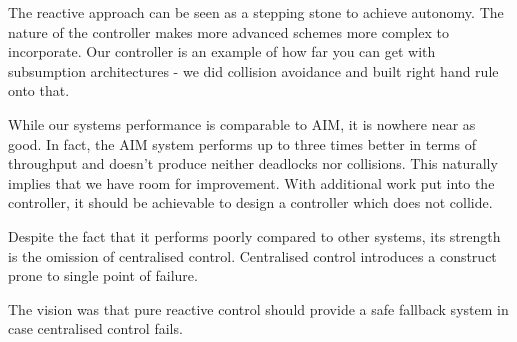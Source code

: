 The reactive approach can be seen as a stepping stone to achieve autonomy.
The nature of the controller makes more advanced schemes more complex to incorporate.
Our controller is an example of how far you can get with subsumption architectures - we did collision avoidance and built right hand rule onto that.

While our systems performance is comparable to AIM, it is nowhere near as good.
In fact, the AIM system performs up to three times better in terms of throughput and doesn't produce neither deadlocks nor collisions.
This naturally implies that we have room for improvement.
With additional work put into the controller, it should be achievable to design a controller which does not collide.

Despite the fact that it performs poorly compared to other systems, its strength is the omission of centralised control. 
Centralised control introduces a construct prone to single point of failure.

The vision was that pure reactive control should provide a safe fallback system in case centralised control fails.
